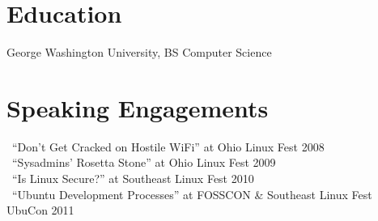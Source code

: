 \documentclass[line, letterpaper]{res}
\begin{document}
\address{Silver Spring, MD 20906\\(512) 981-6226\\maco@mackenzie.morgan.name\\GitHub: maco}
\begin{resume}
	



%
%		
%		
		

	\section{Education}
        George Washington University, BS Computer Science

	\section{Speaking Engagements}
			\textbullet \ ``Don't Get Cracked on Hostile WiFi'' at Ohio Linux Fest 2008\\
			\textbullet \ ``Sysadmins' Rosetta Stone'' at Ohio Linux Fest 2009\\
			\textbullet \ ``Is Linux Secure?'' at Southeast Linux Fest 2010\\
			\textbullet \ ``Ubuntu Development Processes'' at FOSSCON \& Southeast Linux Fest UbuCon 2011\\
\end{resume}
\end{document}
